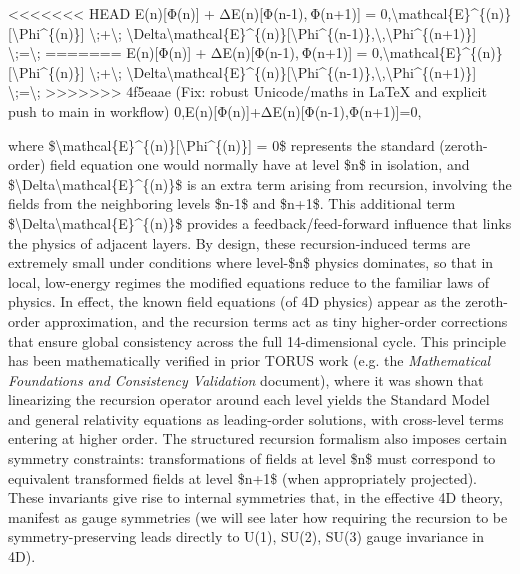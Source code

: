 \documentclass[]{article}
\begin{document}
<<<<<<< HEAD
E(n){[}Φ(n){]}  +  ΔE(n){[}Φ(n-1), Φ(n+1){]}  =  0,\textbackslash mathcal\{E\}\^{}\{(n)\}{[}\textbackslash Phi\^{}\{(n)\}{]}
\textbackslash;+\textbackslash;
\textbackslash Delta\textbackslash mathcal\{E\}\^{}\{(n)\}{[}\textbackslash Phi\^{}\{(n-1)\},\textbackslash,\textbackslash Phi\^{}\{(n+1)\}{]}
\textbackslash;=\textbackslash;
=======
E(n){[}Φ(n){]}  +  ΔE(n){[}Φ(n-1), Φ(n+1){]}  =  0,\textbackslash{}mathcal\{E\}\^{}\{(n)\}{[}\textbackslash{}Phi\^{}\{(n)\}{]}
\textbackslash{};+\textbackslash{};
\textbackslash{}Delta\textbackslash{}mathcal\{E\}\^{}\{(n)\}{[}\textbackslash{}Phi\^{}\{(n-1)\},\textbackslash{},\textbackslash{}Phi\^{}\{(n+1)\}{]}
\textbackslash{};=\textbackslash{};
>>>>>>> 4f5eaae (Fix: robust Unicode/maths in LaTeX and explicit push to main in workflow)
0,E(n){[}Φ(n){]}+ΔE(n){[}Φ(n-1),Φ(n+1){]}=0,

where
\$\textbackslash{}mathcal\{E\}\^{}\{(n)\}{[}\textbackslash{}Phi\^{}\{(n)\}{]}
= 0\$ represents the standard (zeroth-order) field equation one would
normally have at level \$n\$ in isolation, and
\$\textbackslash{}Delta\textbackslash{}mathcal\{E\}\^{}\{(n)\}\$ is an
extra term arising from recursion, involving the fields from the
neighboring levels \$n-1\$ and \$n+1\$. This additional term
\$\textbackslash{}Delta\textbackslash{}mathcal\{E\}\^{}\{(n)\}\$
provides a feedback/feed-forward influence that links the physics of
adjacent layers. By design, these recursion-induced terms are extremely
small under conditions where level-\$n\$ physics dominates, so that in
local, low-energy regimes the modified equations reduce to the familiar
laws of physics. In effect, the known field equations (of 4D physics)
appear as the zeroth-order approximation, and the recursion terms act as
tiny higher-order corrections that ensure global consistency across the
full 14-dimensional cycle. This principle has been mathematically
verified in prior TORUS work (e.g. the \emph{Mathematical Foundations
and Consistency Validation} document), where it was shown that
linearizing the recursion operator around each level yields the Standard
Model and general relativity equations as leading-order solutions, with
cross-level terms entering at higher order. The structured recursion
formalism also imposes certain symmetry constraints: transformations of
fields at level \$n\$ must correspond to equivalent transformed fields
at level \$n+1\$ (when appropriately projected). These invariants give
rise to internal symmetries that, in the effective 4D theory, manifest
as gauge symmetries (we will see later how requiring the recursion to be
symmetry-preserving leads directly to U(1), SU(2), SU(3) gauge
invariance in 4D).
\end{document}
